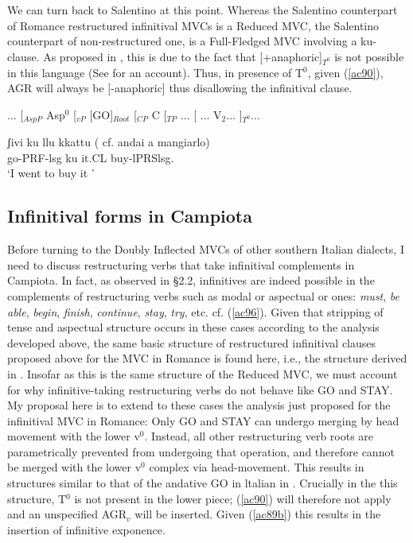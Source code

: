 \documentclass[output=paper]{langscibook}
\begin{document}
We can turn back to Salentino at this point. Whereas the Salentino counterpart of Romance restructured infinitival MVCs is a Reduced MVC, the Salentino counterpart of non-restructured one, is a Full-Fledged MVC involving a ku-clause.  As proposed in \cite{calabrese1993a}, this is due to the fact that [+anaphoric]$_{T^0}$ is not possible in this language (See \cite{calabrese1993a} for an account).  Thus, in presence of T$^0$, given (\ref{ac90}), AGR will always be [-anaphoric] thus disallowing the infinitival clause.

\ea\label{ac94}
 ... [$_{AspP}$ Asp$^0$ [$_{vP}$ [GO]$_{Root}$ [$_{CP}$ C [$_{TP}$ ... [ ... V$_2$... ]$_{T^0}$...
\z

\ea \label{ac95} \gll  ʃivi  ku  llu kkattu ( cf. andai a mangiarlo)\\
  go-PRF-lsg  ku  it.CL buy-lPRSlsg. \\
 \glt ‘I went to buy it '
\z

\subsection{Infinitival forms in Campiota}

Before turning to the Doubly Inflected MVCs of other southern Italian dialects, I need to discuss restructuring verbs that take infinitival complements in Campiota. In fact, as observed in §2.2, infinitives are indeed possible in the complements of restructuring verbs such as modal or aspectual or ones: \textit{must},\textit{ be  able},  \textit{begin},  \textit{finish},  \textit{continue},  \textit{stay},  \textit{try}, etc. cf. (\ref{ac96}). Given that stripping of tense and aspectual structure occurs in these cases according to the analysis developed above, the same basic structure of restructured infinitival clauses proposed above for the MVC in Romance is found here, i.e., the structure derived in . Insofar as this is the same structure of the Reduced MVC, we must account for why infinitive-taking restructuring verbs do not behave like GO and STAY. My proposal here is to extend to these cases the analysis just proposed for the infinitival MVC in Romance: Only GO and STAY can undergo merging  by  head  movement  with  the  lower  v$^0$.  Instead, all other restructuring verb roots are parametrically prevented from undergoing that operation, and therefore cannot be merged with the lower v$^0$ complex via head-movement. This results in structures similar to that of the andative GO in ltalian in . Crucially in the this structure, T$^0$ is not present in the lower piece; (\ref{ac90}) will therefore not apply and an unspecified AGR$_v$ will be inserted.  Given (\ref{ac89b}) this results in the insertion of infinitive exponence.
\end{document}
